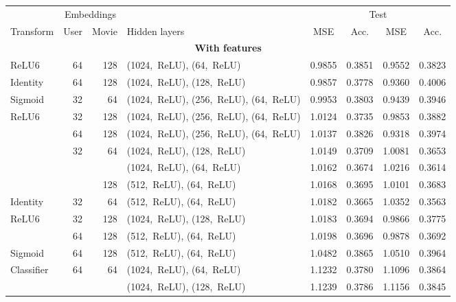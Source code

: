 \begin{table}
\centering
\begin{tabular}{lrr>{\raggedright\arraybackslash}p{3.6cm}cccc}
\toprule
           & \multicolumn{2}{c}{Embeddings} &     &  \multicolumn{2}{c}{CV} & \multicolumn{2}{c}{Test} \\
           \cmidrule(lr){2-3}\cmidrule(lr){5-6}\cmidrule(l){7-8}
Transform & User & Movie & Hidden layers &  MSE & Acc. & MSE & Acc.  \\
\midrule
\multicolumn{8}{c}{\textbf{With features}}\\\addlinespace
ReLU6 & 64 & 128 & (1024,~ReLU), (64,~ReLU) &  0.9855 &      0.3851 &   0.9552 &        0.3823 \\
Identity & 64 & 128 & (1024,~ReLU), (128,~ReLU) &  0.9857 &      0.3778 &   0.9360 &        0.4006 \\
Sigmoid & 32 & 64  & (1024,~ReLU), (256,~ReLU), (64,~ReLU) &  0.9953 &      0.3803 &   0.9439 &        0.3946 \\
ReLU6 & 32 & 128 & (1024,~ReLU), (256,~ReLU), (64,~ReLU) &  1.0124 &      0.3735 &   0.9853 &        0.3882 \\
           & 64 & 128 & (1024,~ReLU), (256,~ReLU), (64,~ReLU) &  1.0137 &      0.3826 &   0.9318 &        0.3974 \\
           & 32 & 64  & (1024,~ReLU), (128,~ReLU) &  1.0149 &      0.3709 &   1.0081 &        0.3653 \\
           &    &     & (1024,~ReLU), (64,~ReLU) &  1.0162 &      0.3674 &   1.0216 &        0.3614 \\
           &    & 128 & (512,~ReLU), (64,~ReLU) &  1.0168 &      0.3695 &   1.0101 &        0.3683 \\
Identity & 32 & 64  & (512,~ReLU), (64,~ReLU) &  1.0182 &      0.3665 &   1.0352 &        0.3563 \\
ReLU6 & 32 & 128 & (1024,~ReLU), (128,~ReLU) &  1.0183 &      0.3694 &   0.9866 &        0.3775 \\
           & 64 & 128 & (512,~ReLU), (64,~ReLU) &  1.0198 &      0.3696 &   0.9878 &        0.3692 \\
Sigmoid & 64 & 128 & (512,~ReLU), (64,~ReLU) &  1.0482 &      0.3865 &   1.0510 &        0.3964 \\
Classifier & 64 & 64  & (1024,~ReLU), (64,~ReLU) &  1.1232 &      0.3780 &   1.1096 &        0.3864 \\
           &    &     & (1024,~ReLU), (128,~ReLU) &  1.1239 &      0.3786 &   1.1156 &        0.3845 \\

\end{tabular}
\end{table}
